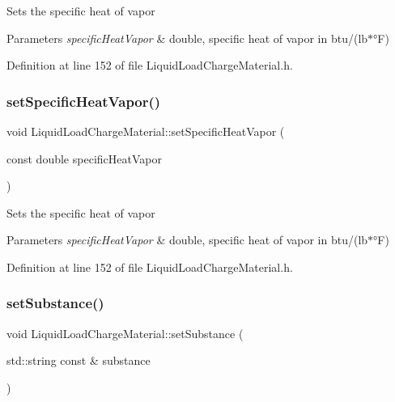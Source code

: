 Sets the specific heat of vapor 
\begin{DoxyParams}{Parameters}
{\em specific\+Heat\+Vapor} & double, specific heat of vapor in btu/(lb$\ast$°F) \\
\hline
\end{DoxyParams}


Definition at line 152 of file Liquid\+Load\+Charge\+Material.\+h.

\mbox{\label{class_liquid_load_charge_material_ae95faf01cf6293ab282b1b7fe3b849e1}} 
\subsubsection{\texorpdfstring{set\+Specific\+Heat\+Vapor()}{setSpecificHeatVapor()}\hspace{0.1cm}{\footnotesize\ttfamily [3/3]}}
{\footnotesize\ttfamily void Liquid\+Load\+Charge\+Material\+::set\+Specific\+Heat\+Vapor (\begin{DoxyParamCaption}\item[{const double}]{specific\+Heat\+Vapor }\end{DoxyParamCaption})\hspace{0.3cm}{\ttfamily [inline]}}

Sets the specific heat of vapor 
\begin{DoxyParams}{Parameters}
{\em specific\+Heat\+Vapor} & double, specific heat of vapor in btu/(lb$\ast$°F) \\
\hline
\end{DoxyParams}


Definition at line 152 of file Liquid\+Load\+Charge\+Material.\+h.

\mbox{\label{class_liquid_load_charge_material_a85bb43270c6a11a1eaf51f00da16746a}} 
\subsubsection{\texorpdfstring{set\+Substance()}{setSubstance()}\hspace{0.1cm}{\footnotesize\ttfamily [1/3]}}
{\footnotesize\ttfamily void Liquid\+Load\+Charge\+Material\+::set\+Substance (\begin{DoxyParamCaption}\item[{std\+::string const \&}]{substance }\end{DoxyParamCaption})\hspace{0.3cm}{\ttfamily [inline]}}

